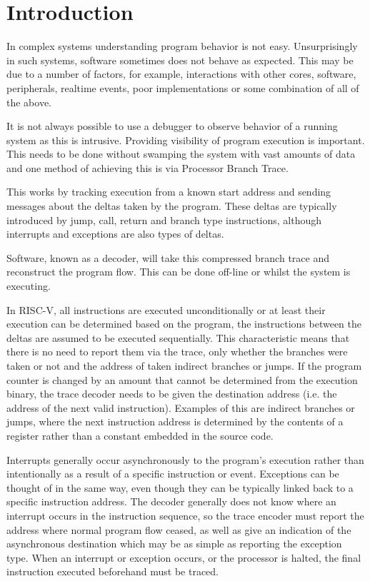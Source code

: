 \chapter{Introduction}
\label{sec:intro}

In complex systems understanding program behavior is not easy.
Unsurprisingly in such systems, software sometimes does not behave as
expected. This may be due to a number of factors, for example,
interactions with other cores, software, peripherals, realtime
events, poor implementations or some combination of all of the above.

It is not always possible to use a debugger to observe behavior of a
running system as this is intrusive.  Providing visibility of program
execution is important.  This needs to be done without swamping the
system with vast amounts of data and one method of achieving this is
via Processor Branch Trace.

This works by tracking execution from a known start address and sending
messages about the deltas taken by the program. These deltas are typically
introduced by jump, call, return and branch type instructions,
although interrupts and exceptions are also types of deltas.

Software, known as a decoder, will take this compressed branch trace
and reconstruct the program flow. This can be done off-line or
whilst the system is executing.

In RISC-V, all instructions are executed unconditionally or at least
their execution can be determined based on the program, the
instructions between the deltas are assumed to be executed
sequentially.  This characteristic means that there is no need to
report them via the trace, only whether the branches were taken or not
and the address of taken indirect branches or jumps. If the program
counter is changed by an amount that cannot be determined from the
execution binary, the trace decoder needs to be given the destination
address (i.e. the address of the next valid instruction).  Examples of
this are indirect branches or jumps, where the next instruction
address is determined by the contents of a register rather than a
constant embedded in the source code.

Interrupts generally occur asynchronously to the program's execution
rather than intentionally as a result of a specific instruction or
event.  Exceptions can be thought of in the same way, even though they
can be typically linked back to a specific instruction address.  The
decoder generally does not know where an interrupt occurs in the
instruction sequence, so the trace encoder must report the address
where normal program flow ceased, as well as give an indication of the
asynchronous destination which may be as simple as reporting the
exception type.  When an interrupt or exception occurs, or the
processor is halted, the final instruction executed beforehand must be
traced.


